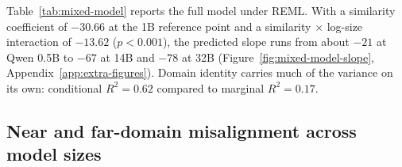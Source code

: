 \documentclass{article}
\begin{document}
Table~\ref{tab:mixed-model} reports the full model under REML. With a similarity coefficient of $-30.66$ at the 1B reference point and a similarity $\times$ log-size interaction of $-13.62$ ($p<0.001$), the predicted slope runs from about $-21$ at Qwen 0.5B to $-67$ at 14B and $-78$ at 32B (Figure~\ref{fig:mixed-model-slope}, Appendix~\ref{app:extra-figures}). Domain identity carries much of the variance on its own: conditional $R^2 = 0.62$ compared to marginal $R^2 = 0.17$.

\begin{table}[t]
\captionsetup{font=normalsize,skip=3pt}
\caption{REML mixed-effects model of adjusted alignment score with similarity, log model size, their interaction, model family, and crossed train/test intercepts. Family contrasts use Gemma-3; log size is $\log$ parameters in billions. $n=1515$ (15 cells undefined); variance: train $=120.9$, test $=58.9$, residual $=152.4$. The interaction improves fit ($\chi^2(1)=52.11$, $p\approx5\times10^{-13}$).}
\label{tab:mixed-model}
\centering
{}
\end{table}

\subsection{Near and far-domain misalignment across model sizes}
\label{sec:near-far}
\end{document}
